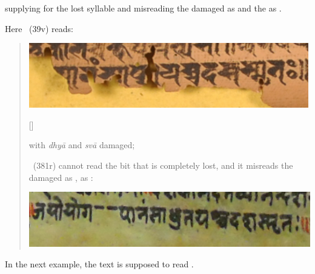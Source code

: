 \noindent
supplying  for the lost syllable and misreading the 
damaged  as  and the  as .

Here \msNa\ (\fol39v) reads:

\begin{quote}
\includegraphics[scale=.5]{images/japoyoga_msNa.png}

[]  

with \textit{dhyā} and \textit{svā} damaged;

\msL\ (\fol381r) cannot read the bit that 
is completely lost, and it misreads 
the damaged  as ,  as :
\smallskip

\includegraphics[scale=.3]{images/japoyoga_msL.png}
\end{quote}

\noindent
In the next example, the text is supposed to read
. 


